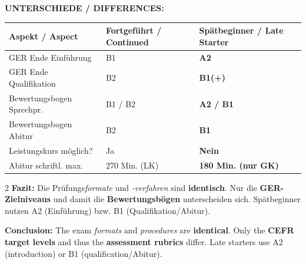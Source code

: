 \documentclass[10pt,a4paper]{article}
\begin{document}
\begin{center}
\small
\textbf{UNTERSCHIEDE / DIFFERENCES:}
\vspace{1mm}

\begin{tabular}{|p{4cm}|p{4cm}|p{4cm}|}
\hline
\rowcolor{lightgray}
\textbf{Aspekt / Aspect} & \textbf{Fortgeführt / Continued} & \textbf{\textcolor{spaet}{Spätbeginner / Late Starter}} \\
\hline
GER Ende Einführung & B1 & \textcolor{spaet}{\textbf{A2}} \\
\hline
GER Ende Qualifikation & B2 & \textcolor{spaet}{\textbf{B1(+)}} \\
\hline
Bewertungsbogen Sprechpr. & B1 / B2 & \textcolor{spaet}{\textbf{A2 / B1}} \\
\hline
Bewertungsbogen Abitur & B2 & \textcolor{spaet}{\textbf{B1}} \\
\hline
Leistungskurs möglich? & Ja & \textcolor{spaet}{\textbf{Nein}} \\
\hline
Abitur schriftl. max. & 270 Min. (LK) & \textcolor{spaet}{\textbf{180 Min. (nur GK)}} \\
\hline
\end{tabular}
\end{center}

\vspace{2mm}

\begin{paracol}{2}
\scriptsize
\textbf{Fazit:} Die Prüfungs\textit{formate} und \textit{-verfahren} sind \textbf{identisch}. Nur die \textbf{GER-Zielniveaus} und damit die \textbf{Bewertungsbögen} unterscheiden sich. Spätbeginner nutzen A2 (Einführung) bzw. B1 (Qualifikation/Abitur).

\switchcolumn

\scriptsize\color{english}
\textbf{Conclusion:} The exam \textit{formats} and \textit{procedures} are \textbf{identical}. Only the \textbf{CEFR target levels} and thus the \textbf{assessment rubrics} differ. Late starters use A2 (introduction) or B1 (qualification/Abitur).

\end{paracol}


\vspace{4mm}
\end{document}
